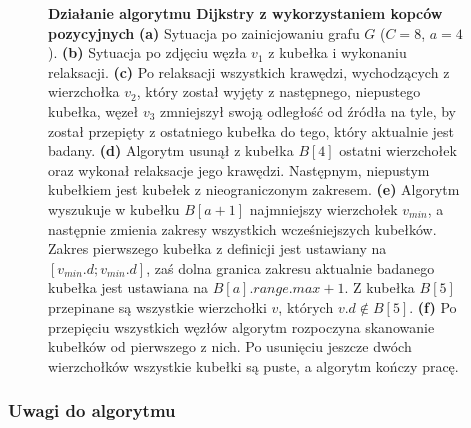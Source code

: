 \begin{figure}[!htbp]
\begin{subfigure}[b]{0.3\textwidth}
		\caption{}
	\end{subfigure}
	\caption{\textbf{Działanie algorytmu Dijkstry z wykorzystaniem kopców pozycyjnych} \textbf{(a)} Sytuacja po zainicjowaniu grafu $G$ ($C=8$, $a=4$). \textbf{(b)} Sytuacja po zdjęciu węzła $v_{1}$ z kubełka i wykonaniu relaksacji. \textbf{(c)} Po relaksacji wszystkich krawędzi, wychodzących z wierzchołka $v_{2}$, który został wyjęty z następnego, niepustego kubełka, węzeł $v_{3}$ zmniejszył swoją odległość od źródła na tyle, by został przepięty z ostatniego kubełka do tego, który aktualnie jest badany. \textbf{(d)} Algorytm usunął z kubełka $B \left[ 4 \right]$ ostatni wierzchołek oraz wykonał relaksacje jego krawędzi. Następnym, niepustym kubełkiem jest kubełek z nieograniczonym zakresem. \textbf{(e)} Algorytm wyszukuje w kubełku $B \left[ a + 1 \right]$ najmniejszy wierzchołek $v_{min}$, a następnie zmienia zakresy wszystkich wcześniejszych kubełków. Zakres pierwszego kubełka z definicji jest ustawiany na $\left[ v_{min}.d ; v_{min}.d \right]$, zaś dolna granica zakresu aktualnie badanego kubełka jest ustawiana na $B \left[ a \right].range.max + 1$. Z kubełka $B \left[ 5 \right]$ przepinane są wszystkie wierzchołki $v$, których $v.d \notin B \left[ 5 \right]$. \textbf{(f)} Po przepięciu wszystkich węzłów algorytm rozpoczyna skanowanie kubełków od pierwszego z nich. Po usunięciu jeszcze dwóch wierzchołków wszystkie kubełki są puste, a algorytm kończy pracę. } \label{fig:exampleRadixHeapC}
\end{figure}

\subsubsection{Uwagi do algorytmu}

